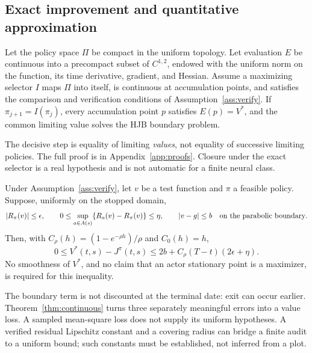 \subsection{Exact improvement and quantitative approximation}
\begin{proposition}\label{prop:exact}
Let the policy space $\Pi$ be compact in the uniform topology. Let evaluation $E$ be continuous into a precompact subset of $C^{1,2}$, endowed with the uniform norm on the function, its time derivative, gradient, and Hessian. Assume a maximizing selector $I$ maps $\Pi$ into itself, is continuous at accumulation points, and satisfies the comparison and verification conditions of Assumption~\ref{ass:verify}. If $\pi_{j+1}=I(\pi_j)$, every accumulation point $p$ satisfies $E(p)=V^*$, and the common limiting value solves the HJB boundary problem.
\end{proposition}
The decisive step is equality of limiting \emph{values}, not equality of successive limiting policies. The full proof is in Appendix~\ref{app:proofs}. Closure under the exact selector is a real hypothesis and is not automatic for a finite neural class.

\begin{theorem}\label{thm:continuous}
Under Assumption~\ref{ass:verify}, let $v$ be a test function and $\pi$ a feasible policy. Suppose, uniformly on the stopped domain,
\[
|R_\pi(v)|\leq\epsilon,\qquad
0\leq\sup_{a\in A(s)}\{R_a(v)-R_\pi(v)\}\leq\eta,
\qquad |v-g|\leq b\quad\hbox{on the parabolic boundary}.
\]
Then, with $C_\rho(h)=(1-e^{-\rho h})/\rho$ and $C_0(h)=h$,
\begin{equation}
0\leq V^*(t,s)-J^\pi(t,s)\leq 2b+C_\rho(T-t)(2\epsilon+\eta).
\label{eq:continuous-bound}
\end{equation}
No smoothness of $V^*$, and no claim that an actor stationary point is a maximizer, is required for this inequality.
\end{theorem}
The boundary term is not discounted at the terminal date: exit can occur earlier. Theorem~\ref{thm:continuous} turns three separately meaningful errors into a value loss. A sampled mean-square loss does not supply its uniform hypotheses. A verified residual Lipschitz constant and a covering radius can bridge a finite audit to a uniform bound; such constants must be established, not inferred from a plot.

